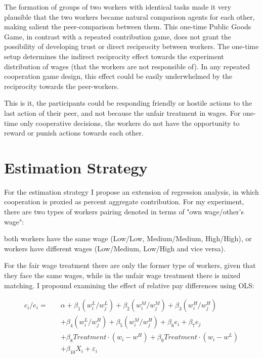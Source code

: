 \documentclass[a4paper, 12pt]{article}
\begin{document}
The formation of groups of two workers with identical tasks made it very plausible that the two workers became natural comparison agents for each other, making salient the peer-comparison between them. This one-time Public Goods Game, in contrast with a repeated contribution game, does not grant the possibility of developing trust or direct reciprocity between workers. The one-time setup determines the indirect reciprocity effect towards the experiment distribution of wages (that the workers are not responsible of). In any repeated cooperation game design, this effect could be easily underwhelmed by the reciprocity towards the peer-workers. 

This is it, the participants could be responding friendly or hostile actions to the last action of their peer, and not because the unfair treatment in wages. For one-time only cooperative decisions, the workers do not have the opportunity to reward or punish actions towards each other. 

\section{Estimation Strategy}

For the estimation strategy I propose an extension of \cite{SPRAGGON2009} regression analysis, in which cooperation is proxied as percent aggregate contribution. For my experiment, there are two types of workers pairing denoted in terms of "own wage/other's wage": 

both workers have the same wage (Low/Low, Medium/Medium, High/High), or workers have different wages (Low/Medium, Low/High and vice versa). 

For the fair wage treatment there are only the former type of workers, given that they face the same wages, while in the unfair wage treatment there is mixed matching.
I propound examining the effect of relative pay differences using OLS:

\begin{equation}
\begin{aligned}
c_i/e_i =\quad  &  \alpha + \beta_1(w_i^L/w_j^L) + \beta_2(w_i^M/w_j^M) + \beta_3(w_i^H/w_j^H)\\
                & + \beta_4(w_i^L/w_j^H) + \beta_5(w_i^M/w_j^H) + \beta_6e_i + \beta_7e_j\\
                & + \beta_8Treatment\cdot(w_i - w^H) + \beta_9Treatment\cdot(w_i - w^L)\\
                & + \beta_{10}X_i + \varepsilon_i
\end{aligned}
\end{equation}
\end{document}

